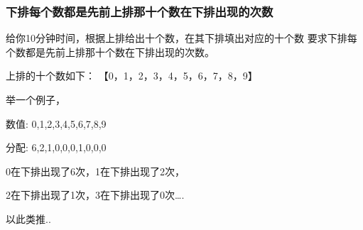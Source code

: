 \documentclass[11pt]{article}
\begin{document}
\subsubsection{下排每个数都是先前上排那十个数在下排出现的次数}
\label{sec-1-1-2}
给你10分钟时间，根据上排给出十个数，在其下排填出对应的十个数   
要求下排每个数都是先前上排那十个数在下排出现的次数。   

上排的十个数如下：   
【0，1，2，3，4，5，6，7，8，9】

举一个例子，   

数值: 0,1,2,3,4,5,6,7,8,9   

分配: 6,2,1,0,0,0,1,0,0,0   

0在下排出现了6次，1在下排出现了2次，   

2在下排出现了1次，3在下排出现了0次\ldots{}.   

以此类推..  
\end{document}
